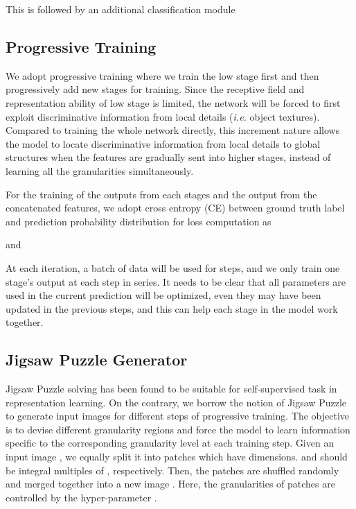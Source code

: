 \documentclass{llncs}
\begin{document}
 This is followed by an additional classification module  









\subsection{Progressive Training}

We adopt progressive training where we train the low stage first and then progressively add new stages for training. Since the receptive field and representation ability of low stage is limited, the network will be forced to first exploit discriminative information from local details ({\em i.e.} object textures). Compared to training the whole network directly, this increment nature allows the model to locate discriminative information from local details to global structures when the features are gradually sent into higher stages, instead of learning all the granularities simultaneously.

For the training of the outputs from each stages and the output from the concatenated features, we adopt cross entropy (CE)  between ground truth label  and prediction probability distribution for loss computation as



and



At each iteration, a batch of data  will be used for  steps, and we only train one stage's output at each step in series. It needs to be clear that all parameters are used in the current prediction will be optimized, even they may have been updated in the previous steps, and this can help each stage in the model work together.


\subsection{Jigsaw Puzzle Generator}


Jigsaw Puzzle solving \cite{wei2019iterative} has been found to be suitable for self-supervised task in representation learning. On the contrary, we borrow the notion of Jigsaw Puzzle to generate input images for different steps of progressive training. The objective is to devise
different granularity regions and force the model to learn information specific to the corresponding granularity level at each training step. Given an input image , we equally split it into  patches which have  dimensions.  and  should be integral multiples of , respectively. Then, the patches are shuffled randomly and merged together into a new image . Here, the granularities of patches are controlled by the hyper-parameter . 
\end{document}
